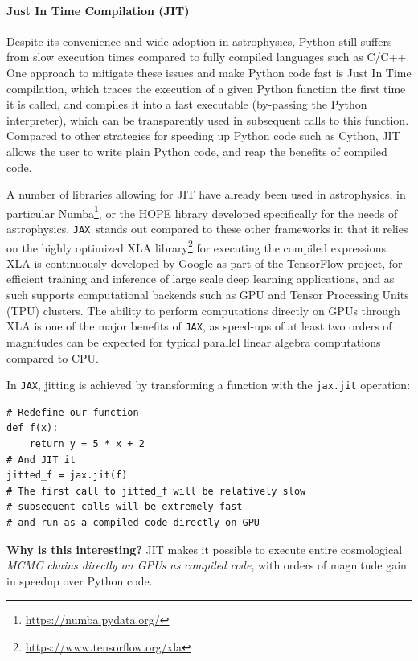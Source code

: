 \documentclass[twocolumn,twocolappendix,nofootinbib,iop]{openjournal}
\newcommand{\jax}{\texttt{JAX}}
\begin{document}
\paragraph{\textbf{Just In Time Compilation (JIT)}} Despite its convenience and wide adoption in astrophysics, Python still suffers from slow execution times compared to fully compiled languages such as C/C++. One approach to mitigate these issues and make Python code fast is Just In Time compilation, which traces the execution of a given Python function the first time it is called, and compiles it into a fast executable (by-passing the Python interpreter), which can be transparently used in subsequent calls to this function. Compared to other strategies for speeding up Python code such as Cython, JIT allows the user to write plain Python code, and reap the benefits of compiled code.

A number of libraries allowing for JIT have already been used in astrophysics, in particular Numba\footnote{\url{https://numba.pydata.org/}}, or the HOPE library \cite{2015A&C....10....1A} developed specifically for the needs of astrophysics. \jax\ stands out compared to these other frameworks in that it relies on the highly optimized XLA library\footnote{\url{https://www.tensorflow.org/xla}} for executing the compiled expressions. XLA is continuously developed by Google as part of the TensorFlow project, for efficient training and inference of large scale deep learning applications, and as such supports computational backends such as GPU and Tensor Processing Units (TPU) clusters. The ability to perform computations directly on GPUs through XLA is one of the major benefits of \jax, as speed-ups of at least two orders of magnitudes can be expected for typical parallel linear algebra computations compared to CPU.

In \jax, jitting is achieved by transforming a function with the \texttt{jax.jit} operation:
\begin{lstlisting}[language=iPython]
# Redefine our function
def f(x):
	return y = 5 * x + 2
# And JIT it
jitted_f = jax.jit(f)
# The first call to jitted_f will be relatively slow
# subsequent calls will be extremely fast
# and run as a compiled code directly on GPU
\end{lstlisting}

\textbf{Why is this interesting?} JIT makes it possible to execute entire cosmological \textit{MCMC chains directly on GPUs as compiled code}, with orders of magnitude gain in speedup over Python code.
\end{document}
